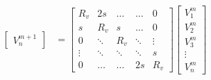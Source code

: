 \begin{align*}
\begin{bmatrix}
    V_n^{m+1}
\end{bmatrix}
&=
\begin{bmatrix}
    R_v    & 2s     & \dots  & \dots  & 0 \\
    s      & R_v    & s      & \dots  & 0 \\
    0      & \ddots & R_v    & \ddots & \vdots \\
    \vdots & \ddots & \ddots & \ddots & s   \\
    0      & \dots  & \dots  & 2s     & R_v
\end{bmatrix}
\begin{bmatrix}
    V_1^{m}     \\
    V_2^{m}     \\
    V_3^{m}     \\
    \vdots      \\
    V_n^{m}
\end{bmatrix}
\end{align*}
